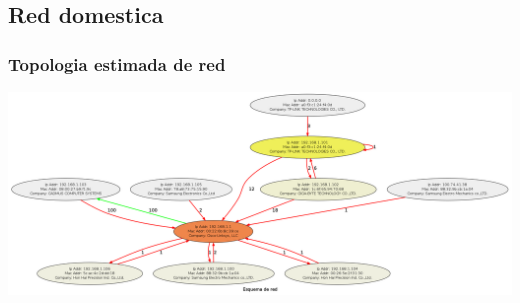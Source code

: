 \subsection{Red domestica}
\subsubsection{Topologia estimada de red}
\includegraphics[scale=0.22]{../experimentacion-svilerino/casa/graph.png}

